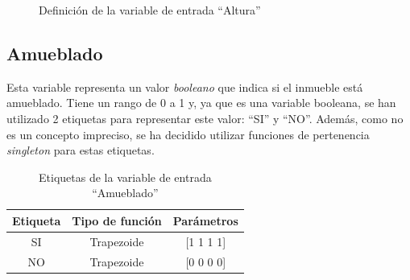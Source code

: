 \documentclass[12pt]{report} %
\begin{document}
        \begin{figure}[H]
            \centering
            \caption{Definición de la variable de entrada ``Altura''}
        \end{figure}

        \subsection{Amueblado}
        Esta variable representa un valor \textit{booleano} que indica si el inmueble está amueblado.
        Tiene un rango de 0 a 1 y, ya que es una variable booleana, se han utilizado 2 etiquetas para representar este valor: ``SI'' y ``NO''.
        Además, como no es un concepto impreciso, se ha decidido utilizar funciones de pertenencia \textit{singleton} para estas etiquetas.

        \begin{table}[h]
            \center
            \begin{tabular}{@{}ccc@{}}
                \toprule
                \textbf{Etiqueta} & \textbf{Tipo de función} & \textbf{Parámetros} \\
                \midrule
                SI & Trapezoide & [1 1 1 1] \\
                NO & Trapezoide & [0 0 0 0] \\
                \bottomrule
            \end{tabular}
            \caption{Etiquetas de la variable de entrada ``Amueblado''}
        \end{table}
\end{document}
